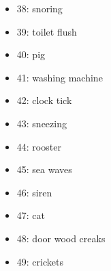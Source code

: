\documentclass{article}
\begin{document}
\begin{sloppy}
\begin{itemize}
  \item 38: snoring
  \item 39: toilet flush
  \item 40: pig
  \item 41: washing machine
  \item 42: clock tick
  \item 43: sneezing
  \item 44: rooster
  \item 45: sea waves
  \item 46: siren
  \item 47: cat
  \item 48: door wood creaks
  \item 49: crickets
\end{itemize}

\end{sloppy}
\end{document}
